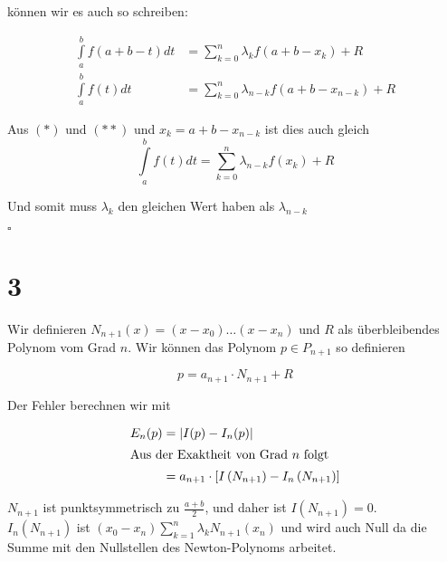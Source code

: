\documentclass[ngerman,a4paper]{scrartcl}
\begin{document}
können wir es auch so schreiben:

\begin{align*}
  \int\limits^b_a f(a+b-t) dt &= \sum^n_{k=0} \lambda_k f(a+b-x_k)
  + R\\
  \int\limits^b_a f(t) dt &= \sum^n_{k=0} \lambda_{n-k} f(a+b-x_{n-k})
  + R
\end{align*}

Aus $(*)$ und $(**)$ und $x_k = a+b-x_{n-k}$ ist dies auch gleich
\[
\int\limits^b_a f(t) dt =\sum^n_{k=0} \lambda_{n-k} f(x_k) + R
\]

Und somit muss $\lambda_k$ den gleichen Wert haben als $\lambda_{n-k}$

\hfill$\square$
\section*{3}

Wir definieren $N_{n+1}(x) = (x - x_0)\dots(x-x_n)$ und $R$ als
überbleibendes Polynom vom Grad $n$. Wir können das Polynom $p \in
P_{n+1}$ so definieren

\[
p = a_{n+1} \cdot N_{n+1} + R
\]

Der Fehler berechnen wir mit

\begin{align*}
  E_n(p) &= |I(p) - I_n(p)|\\
  \intertext{Aus der Exaktheit von Grad $n$ folgt}
  &= a_{n+1}\cdot\left[I\left(N_{n+1}\right) -
    I_n\left(N_{n+1}\right)\right]
\end{align*}

$N_{n+1}$ ist punktsymmetrisch zu $\frac{a+b}{2}$, und daher ist
$I(N_{n+1}) = 0$.\\

$I_n(N_{n+1})$ ist $(x_0 - x_n)\sum^n_{k=1} \lambda_k N_{n+1}(x_n)$
und wird auch Null da die Summe mit den Nullstellen des
Newton-Polynoms arbeitet.
\end{document}
